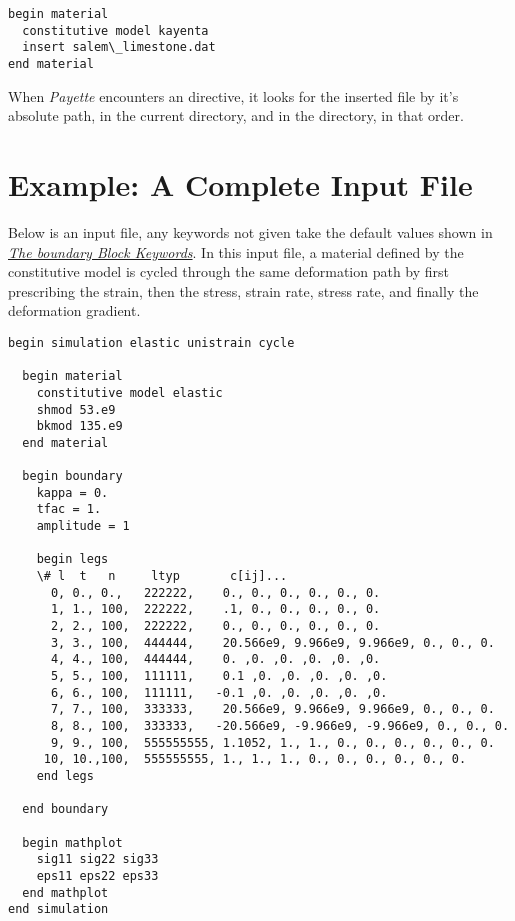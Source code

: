 \documentclass[letterpaper,10pt,english]{sphinxmanual}
\begin{document}
\begin{Verbatim}[commandchars=\\\{\}]
begin material
  constitutive model kayenta
  insert salem\_limestone.dat
end material
\end{Verbatim}

When \emph{Payette} encounters an  directive, it looks for the
inserted file by it's absolute path, in the current directory, and in the
 directory, in that order.
\label{Files/input_file_formatting:examples}

\section{Example: A Complete Input File}
\label{Files/input_file_formatting:complete-input-file}\label{Files/input_file_formatting:example-a-complete-input-file}\label{Files/input_file_formatting:examples}
Below is an input file, any keywords not given take the default values shown in
{\hyperref[Files/input_file_formatting:legs-keywords]{\emph{The boundary Block Keywords}}}. In this input file, a material defined by the 
constitutive model is cycled through the same deformation path by first
prescribing the strain, then the stress, strain rate, stress rate, and finally
the deformation gradient.

\begin{Verbatim}[commandchars=\\\{\}]
begin simulation elastic unistrain cycle

  begin material
    constitutive model elastic
    shmod 53.e9
    bkmod 135.e9
  end material

  begin boundary
    kappa = 0.
    tfac = 1.
    amplitude = 1

    begin legs
    \# l  t   n     ltyp       c[ij]...
      0, 0., 0.,   222222,    0., 0., 0., 0., 0., 0.
      1, 1., 100,  222222,    .1, 0., 0., 0., 0., 0.
      2, 2., 100,  222222,    0., 0., 0., 0., 0., 0.
      3, 3., 100,  444444,    20.566e9, 9.966e9, 9.966e9, 0., 0., 0.
      4, 4., 100,  444444,    0. ,0. ,0. ,0. ,0. ,0.
      5, 5., 100,  111111,    0.1 ,0. ,0. ,0. ,0. ,0.
      6, 6., 100,  111111,   -0.1 ,0. ,0. ,0. ,0. ,0.
      7, 7., 100,  333333,    20.566e9, 9.966e9, 9.966e9, 0., 0., 0.
      8, 8., 100,  333333,   -20.566e9, -9.966e9, -9.966e9, 0., 0., 0.
      9, 9., 100,  555555555, 1.1052, 1., 1., 0., 0., 0., 0., 0., 0.
     10, 10.,100,  555555555, 1., 1., 1., 0., 0., 0., 0., 0., 0.
    end legs

  end boundary

  begin mathplot
    sig11 sig22 sig33
    eps11 eps22 eps33
  end mathplot
end simulation
\end{Verbatim}
\end{document}
